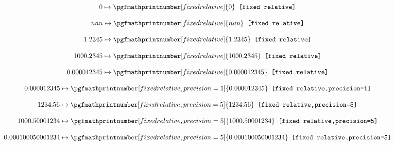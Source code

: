 \documentclass[a4paper]{article}
\begin{document}
\parindent=0pt

\def\pretty[#1]#2{%
	\[ #2 \mapsto \pgfmathprintnumber[#1]{#2} \texttt{ [#1]}\]
}

\pretty[fixed relative]{0}
\pretty[fixed relative]{nan}
\pretty[fixed relative]{1.2345}
\pretty[fixed relative]{1000.2345}
\pretty[fixed relative]{0.000012345}
\pretty[fixed relative,precision=1]{0.000012345}
\pretty[fixed relative,precision=5]{1234.56}
\pretty[fixed relative,precision=5]{1000.50001234}
\pretty[fixed relative,precision=5]{0.000100050001234}
\end{document}
